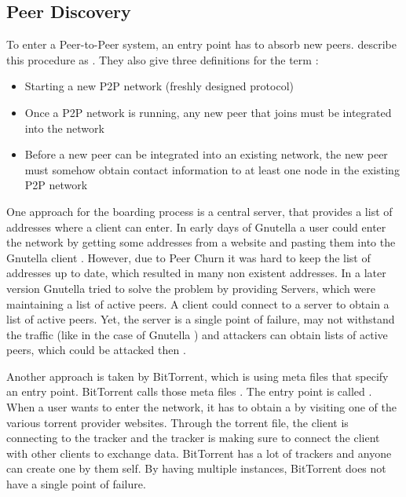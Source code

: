 \subsection{Peer Discovery}
To enter a Peer-to-Peer system, an entry point has to absorb new peers. 
\citet{p2p-bootstrapping} describe this procedure as . 
They also give three definitions for the term :
\begin{itemize}
        \item Starting a new P2P network (freshly designed protocol)
        \item Once a P2P network is running, any new peer that joins must be integrated into the network
        \item Before a new peer can be integrated into an existing network, the new peer must somehow obtain contact information to at least one node in the existing P2P network
\end{itemize}
\citet[p. 3]{p2p-bootstrapping}

One approach for the boarding process is a central server, that provides a list of addresses where a client can enter. In early days of Gnutella a user could enter the network by getting some addresses from a website and pasting them into the Gnutella client \cite[\S3.2]{gnutellaAnalysis}. However, due to Peer Churn it was hard to keep the list of addresses up to date, which resulted in many non existent addresses. In a later version Gnutella tried to solve the problem by providing  Servers, which were maintaining a list of active peers. A client could connect to a  server to obtain a list of active peers. Yet, the server is a single point of failure, may not withstand the traffic (like in the case of Gnutella \cite[\S3.2]{gnutellaAnalysis}) and attackers can obtain lists of active peers, which could be attacked then \cite[p. 7]{p2p-bootstrapping}.

Another approach is taken by BitTorrent, which is using meta files that specify  an entry point. BitTorrent calls those meta files . The entry point is called . When a user wants to enter the network, it has to obtain a  by visiting one of the various torrent provider websites. Through the torrent file, the client is connecting to the tracker and the tracker is making sure to connect the client with other clients to exchange data. BitTorrent has a lot of trackers and anyone can create one by them self. By having multiple instances, BitTorrent does not have a single point of failure.

